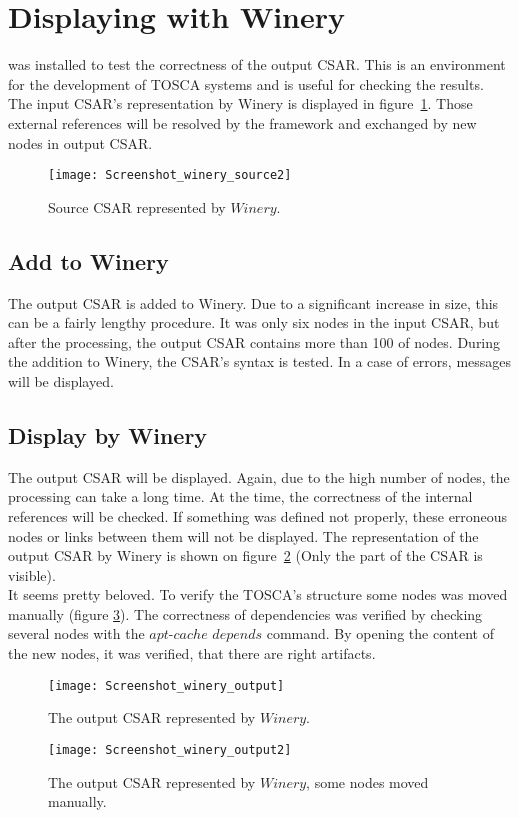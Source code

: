 \section{Displaying with Winery}\label{sec:checkwin}
  was installed to test the correctness of the output CSAR. 
 This is an environment for the development of TOSCA systems and is useful for checking the results. %
 The input CSAR's representation by Winery is displayed in figure~\ref{fig:winery_source2}.
 Those external references will be resolved by the framework and exchanged by new nodes in output CSAR. 
 \begin{figure}[ht]   
 	\centering
 	\texttt{[image: Screenshot\_winery\_source2]}
 	\caption{Source CSAR represented by $Winery$.}
 	\label{fig:winery_source2}
 \end{figure}
   
 \subsection*{Add to Winery}
 The output CSAR is added to Winery.
 Due to a significant increase in size, this can be a fairly lengthy procedure.
 It was only six nodes in the input CSAR, but after the processing, the output CSAR contains more than 100 of nodes.
 During the addition to Winery, the CSAR's syntax is tested.
 In a case of errors, messages will be displayed.
 
 \subsection*{Display by Winery}
 The output CSAR will be displayed.
 Again, due to the high number of nodes, the processing can take a long time. 
 At the time, the correctness of the internal references will be checked.
 If something was defined not properly, these erroneous nodes or links between them will not be displayed.
The representation of the output CSAR by Winery is shown on figure~\ref{fig:winery_output} (Only the part of the CSAR is visible).\\
 It seems pretty beloved.
 To verify the TOSCA's structure some nodes was moved manually (figure \ref{fig:winery_output2}). 
 The correctness of dependencies was verified by checking several nodes with the $apt$-$cache$ $depends$ command.
 By opening the content of the new nodes, it was verified, that there are right artifacts.
 \begin{figure}[ht]   
 	\centering
 	\texttt{[image: Screenshot\_winery\_output]}  
 	\caption{The output CSAR represented by $Winery$.}
 	\label{fig:winery_output}
 \end{figure}
 \begin{figure}[ht]   
 	\centering
 	\texttt{[image: Screenshot\_winery\_output2]}
 	\caption{The output CSAR represented by $Winery$, some nodes moved manually.}
 	\label{fig:winery_output2}
 \end{figure}


